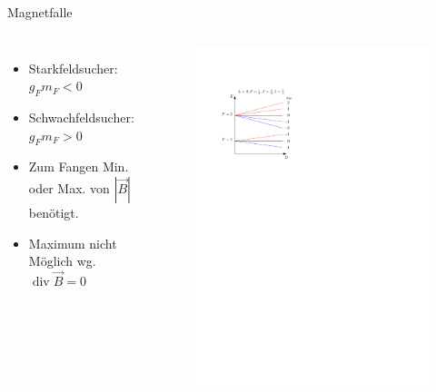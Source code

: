 \documentclass[12pt,xcolor=dvipsnames]{beamer}
\DeclareMathOperator{\divergence}{div}
\begin{document}
\begin{frame}{Magnetfalle}
	\begin{columns}
	\begin{itemize}
		\item Starkfeldsucher: $g_F m_F < 0$
		\item Schwachfeldsucher: $g_F m_F > 0$
		\item Zum Fangen Min. oder Max. von $|\vec{B}|$ benötigt.
		\item Maximum nicht Möglich wg. $\divergence \vec{B} = 0$
	\end{itemize}
		\begin{figure}
			\centering
			\includegraphics{./figures/magnetfalle.pdf}
		\end{figure}
	\end{columns}
\end{frame}
\end{document}
